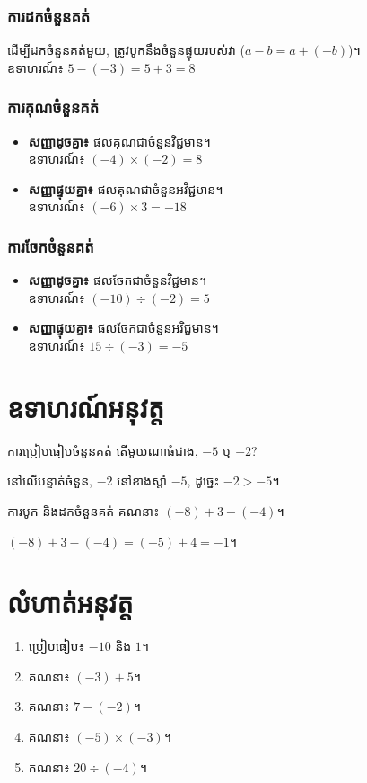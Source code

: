 \subsubsection{ការដកចំនួនគត់}
ដើម្បីដកចំនួនគត់មួយ, ត្រូវបូកនឹងចំនួនផ្ទុយរបស់វា ($a - b = a + (-b)$)។\\
ឧទាហរណ៍៖ $5 - (-3) = 5 + 3 = 8$

\subsubsection{ការគុណចំនួនគត់}
\begin{itemize}
    \item \textbf{សញ្ញាដូចគ្នា៖} ផលគុណជាចំនួនវិជ្ជមាន។\\
    ឧទាហរណ៍៖ $(-4) \times (-2) = 8$
    \item \textbf{សញ្ញាផ្ទុយគ្នា៖} ផលគុណជាចំនួនអវិជ្ជមាន។\\
    ឧទាហរណ៍៖ $(-6) \times 3 = -18$
\end{itemize}

\subsubsection{ការចែកចំនួនគត់}
\begin{itemize}
    \item \textbf{សញ្ញាដូចគ្នា៖} ផលចែកជាចំនួនវិជ្ជមាន។\\
    ឧទាហរណ៍៖ $(-10) \div (-2) = 5$
    \item \textbf{សញ្ញាផ្ទុយគ្នា៖} ផលចែកជាចំនួនអវិជ្ជមាន។\\
    ឧទាហរណ៍៖ $15 \div (-3) = -5$
\end{itemize}

\section{ឧទាហរណ៍អនុវត្ត}

\begin{example}{ការប្រៀបធៀបចំនួនគត់}
    តើមួយណាធំជាង, $-5$ ឬ $-2$?
    \begin{solution}
        នៅលើបន្ទាត់ចំនួន, $-2$ នៅខាងស្តាំ $-5$, ដូច្នេះ $-2 > -5$។
    \end{solution}
\end{example}

\begin{example}{ការបូក និងដកចំនួនគត់}
    គណនា៖ $(-8) + 3 - (-4)$។
    \begin{solution}
        $(-8) + 3 - (-4) = (-5) + 4 = -1$។
    \end{solution}
\end{example}

\section{លំហាត់អនុវត្ត}
\begin{enumerate}[label=\arabic*.]
    \item ប្រៀបធៀប៖ $-10$ និង $1$។
    \item គណនា៖ $(-3) + 5$។
    \item គណនា៖ $7 - (-2)$។
    \item គណនា៖ $(-5) \times (-3)$។
    \item គណនា៖ $20 \div (-4)$។
\end{enumerate}
